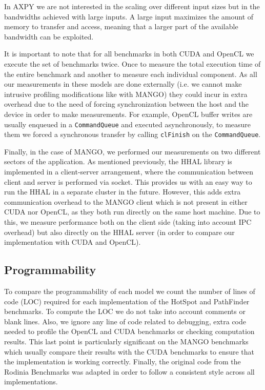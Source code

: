 In AXPY we are not interested in the scaling over different input sizes but in the bandwidths achieved with large inputs. A large input maximizes the amount of memory to transfer and access, meaning that a larger part of the available bandwidth can be exploited.  

It is important to note that for all benchmarks in both CUDA and OpenCL we execute the set of benchmarks twice. Once to measure the total execution time of the entire benchmark and another to measure each individual component. As all our measurements in these models are done externally (i.e. we cannot make intrusive profiling modifications like with MANGO) they could incur in extra overhead due to the need of forcing synchronization between the host and the device in order to make measurements. For example, OpenCL buffer writes are usually enqueued in a \texttt{CommandQueue} and executed asynchronously, to measure them we forced a synchronous transfer by calling \texttt{clFinish} on the \texttt{CommandQueue}.

Finally, in the case of MANGO, we performed our measurements on two different sectors of the application. As mentioned previously, the HHAL library is implemented in a client-server arrangement, where the communication between client and server is performed via socket. This provides us with an easy way to run the HHAL in a separate cluster in the future. However, this adds extra communication overhead to the MANGO client which is not present in either CUDA nor OpenCL, as they both run directly on the same host machine. Due to this, we measure performance both on the client side (taking into account IPC overhead) but also directly on the HHAL server (in order to compare our implementation with CUDA and OpenCL).

\subsection{Programmability}

To compare the programmability of each model we count the number of lines of code (LOC) required for each implementation of the HotSpot and PathFinder benchmarks. To compute the LOC we do not take into account comments or blank lines. Also, we ignore any line of code related to debugging, extra code needed to profile the OpenCL and CUDA benchmarks or checking computation results. This last point is particularly significant on the MANGO benchmarks which usually compare their results with the CUDA benchmarks to ensure that the implementation is working correctly. Finally, the original code from the Rodinia Benchmarks was adapted in order to follow a consistent style across all implementations. 

